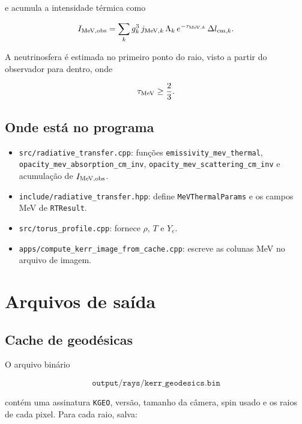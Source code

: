 \documentclass[11pt,a4paper]{article}
\begin{document}
e acumula a intensidade térmica como

\begin{equation}
  I_{\rm MeV,obs} =
  \sum_k
  g_k^3\,
  j_{{\rm MeV},k}\,
  \Lambda_k\,
  e^{-\tau_{{\rm MeV},k}}\,
  \Delta l_{{\rm cm},k}.
\end{equation}

A neutrinosfera é estimada no primeiro ponto do raio, visto a partir do
observador para dentro, onde

\begin{equation}
  \tau_{\rm MeV} \geq \frac{2}{3}.
\end{equation}

\subsection*{Onde está no programa}

\begin{itemize}
  \item \texttt{src/radiative\_transfer.cpp}: funções
  \texttt{emissivity\_mev\_thermal},
  \texttt{opacity\_mev\_absorption\_cm\_inv},
  \texttt{opacity\_mev\_scattering\_cm\_inv} e acumulação de
  $I_{\rm MeV,obs}$.
  \item \texttt{include/radiative\_transfer.hpp}: define
  \texttt{MeVThermalParams} e os campos MeV de \texttt{RTResult}.
  \item \texttt{src/torus\_profile.cpp}: fornece $\rho$, $T$ e $Y_e$.
  \item \texttt{apps/compute\_kerr\_image\_from\_cache.cpp}: escreve as
  colunas MeV no arquivo de imagem.
\end{itemize}

\section{Arquivos de saída}

\subsection{Cache de geodésicas}

O arquivo binário

\begin{equation}
  \texttt{output/rays/kerr\_geodesics.bin}
\end{equation}

contém uma assinatura \texttt{KGEO}, versão, tamanho da câmera, spin usado e
os raios de cada pixel. Para cada raio, salva:
\end{document}
